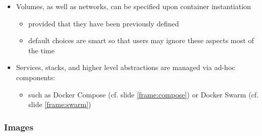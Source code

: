 \documentclass[presentation]{beamer}\mode<presentation>{\usetheme{AMSBolognaFC}}
\begin{document}
\begin{frame}[allowframebreaks]
\begin{itemize}
        \framebreak

        \item Volumes, as well as networks, can be specified upon container instantiation
        \begin{itemize}
            \item provided that they have been previously defined
            \item default choices are smart so that users may ignore these aspects most of the time
        \end{itemize}

        \bigskip

        \item Services, stacks, and higher level abstractions are managed via ad-hoc components:
        \begin{itemize}
            \item such as Docker \alert{Compose} (cf. slide \ref{frame:compose}) or Docker \alert{Swarm} (cf. slide \ref{frame:swarm})
        \end{itemize}

    \end{itemize}

\end{frame}

\subsubsection{Images}
\end{document}
